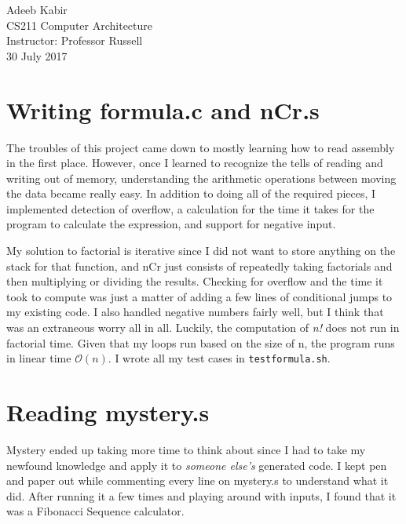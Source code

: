 \documentclass{article}
\begin{document}
Adeeb Kabir \\
CS211 Computer Architecture \\
Instructor: Professor Russell \\
30 July 2017 \\

\section{Writing formula.c and nCr.s}

The troubles of this project came down to mostly learning how to read assembly in the first place.  However, once I learned to recognize the tells of reading and writing out of memory, understanding
the arithmetic operations between moving the data became really easy.  In addition to doing all of the required pieces, I implemented detection of overflow, a calculation for the time it takes for the program to calculate the expression, and support for negative input.

My solution to factorial is iterative since I did not want to store anything on the stack for that function, and nCr just
consists of repeatedly taking factorials and then multiplying or dividing the results.  Checking for overflow and the time it took to compute was just a matter of adding a few lines of conditional
jumps to my existing code.  I also handled negative numbers fairly well, but I think that was an extraneous worry all in all.  Luckily, the computation of \textit{n!} does not run in factorial time.  Given that my loops run based on the size of n, the program runs in linear time $\mathcal{O}(n)$.  I wrote all my test cases in \verb#testformula.sh#.


\section{Reading mystery.s} 


	Mystery ended up taking more time to think about since I had to take my newfound knowledge and apply it to \textit{someone else's} generated code.  I kept pen and paper out while commenting
every line on mystery.s to understand what it did.  After running it a few times and playing around with inputs, I found that it was a Fibonacci Sequence calculator.  
\end{document}
